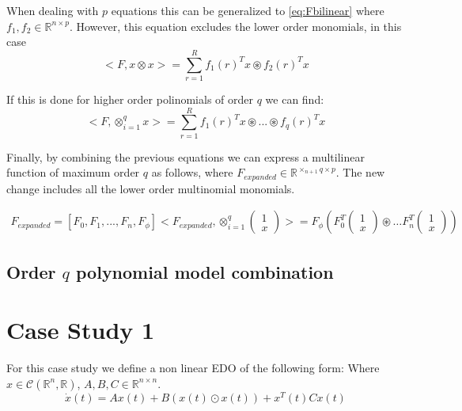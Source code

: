 \documentclass{article}
\begin{document}
When dealing with $p$ equations this can be generalized to \ref{eq:Fbilinear}
where $f_1, f_2 \in \mathbb{R}^{n \times p}$. However, this equation excludes
the lower order monomials, in this case
\begin{equation}\label{eq:Fbilinear}
    <F, x \otimes x> = \sum_{r=1}^R f_1(r)^T x \circledast f_2(r)^T x 
\end{equation}

If this is done for higher order polinomials of order $q$ we can find:
\begin{equation}
    <F, \otimes_{i = 1}^{q} x > = \sum_{r=1}^R f_1(r)^T x \circledast ... \circledast f_q(r)^T x 
\end{equation}

Finally, by combining the previous equations we 
can express a multilinear function of maximum order $q$ as follows,
where $F_{expanded} \in \mathbb{R}^{\times_{n+1}q \times p}$. The new change
includes all the lower order multinomial monomials. 

\begin{align}
    F_{expanded} = [F_0, F_1, ..., F_n, F_\phi]
    <F_{expanded}, \otimes_{i = 1}^{q}
    \begin{pmatrix}
        1 \\
        x
    \end{pmatrix}
    > = F_\phi( F_0^T \begin{pmatrix}
        1 \\
        x
    \end{pmatrix} \circledast \dots
    F_n^T \begin{pmatrix}
        1 \\
        x
    \end{pmatrix})
\end{align}

\subsection{Order $q$ polynomial model combination}

\section{Case Study 1}

For this case study we define a non linear EDO of the following form:
Where $x \in \mathcal{C}(\mathbb{R}^n, \mathbb{R})$, $A, B, C \in \mathbb{R}^{n \times n } $.
\begin{equation}
    \dot{x}(t) = Ax(t) + B(x(t) \odot x(t)) + x^T(t) C x(t)
\end{equation}
\end{document}

